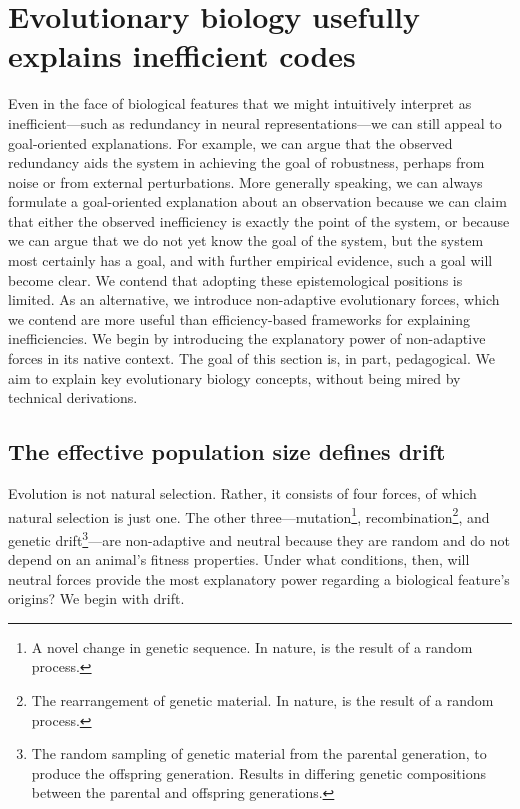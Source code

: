 \documentclass[twocolumn]{article}
\begin{document}
\section{Evolutionary biology usefully explains inefficient codes}

Even in the face of biological features that we might intuitively interpret as inefficient---such as redundancy in neural representations---we can still appeal to goal-oriented explanations. For example, we can argue that the observed redundancy aids the system in achieving the goal of robustness, perhaps from noise or from external perturbations. More generally speaking, we can always formulate a goal-oriented explanation about an observation because we can claim that either the observed inefficiency is exactly the point of the system, or because we can argue that we do not yet know the goal of the system, but the system most certainly has a goal, and with further empirical evidence, such a goal will become clear. We contend that adopting these epistemological positions is limited. As an alternative, we introduce non-adaptive evolutionary forces, which we contend are more useful than efficiency-based frameworks for explaining inefficiencies. We begin by introducing the explanatory power of non-adaptive forces in its native context. The goal of this section is, in part, pedagogical. We aim to explain key evolutionary biology concepts, without being mired by technical derivations. 

\subsection{The effective population size defines drift}

Evolution is not natural selection. Rather, it consists of four forces, of which natural selection is just one. The other three---mutation\footnote{A novel change in genetic sequence. In nature, is the result of a random process.}, recombination\footnote{The rearrangement of genetic material. In nature, is the result of a random process.}, and genetic drift\footnote{The random sampling of genetic material from the parental generation, to produce the offspring generation. Results in differing genetic compositions between the parental and offspring generations.}---are non-adaptive and neutral because they are random and do not depend on an animal's fitness properties. Under what conditions, then, will neutral forces provide the most explanatory power regarding a biological feature's origins? We begin with drift. 
\end{document}
